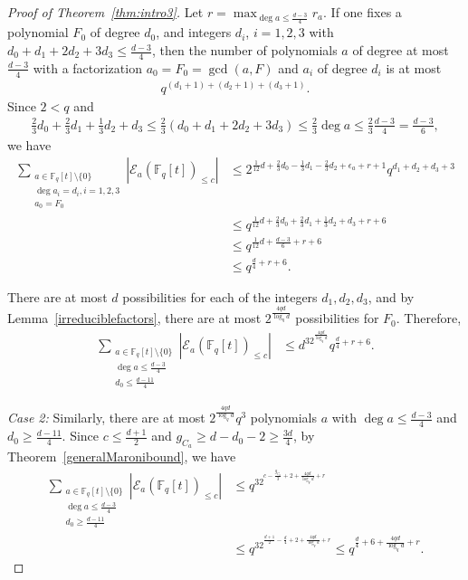 \documentclass[11pt]{article}
\theoremstyle{plain}
\theoremstyle{definition}
\begin{document}
\begin{proof}[Proof of Theorem~\ref{thm:intro3}]
Let $r=\max_{\deg a\leq \frac{d-3}{4}}r_a$. If one fixes a polynomial $F_0$ of degree $d_0$, and integers $d_i$, $i=1,2,3$ with $d_0+d_1+2d_2+3d_3\leq \frac{d-3}{4}$, then the number of polynomials $a$ of degree at most $\frac{d-3}{4}$ with a factorization $a_0=F_0=\gcd(a,F)$ and $a_i$ of degree $d_i$ is at most
\begin{align*}
q^{(d_1+1)+(d_2+1)+(d_3+1)}.
\end{align*}
Since $2<q$ and 
\begin{align*}
\frac{2}{3}d_0+\frac{2}{3}d_1+\frac{1}{3}d_2+d_3\leq \frac{2}{3}(d_0+d_1+2d_2+3d_3)\leq \frac{2}{3}\deg a\leq \frac{2}{3}\frac{d-3}{4}=\frac{d-3}{6},
\end{align*}
we have
\begin{align*}
\sum_{\substack{a\in\mathbb{F}_q[t]\setminus\{0\}\\ \deg a_i=d_i, i=1,2,3\\a_0=F_0}}    \left|\mathcal{E}_a(\mathbb{F}_q[t])_{\leq c}\right|&\leq 2^{\frac{1}{12}d+\frac{2}{3}d_0-\frac{1}{3}d_1-\frac{2}{3}d_2+\epsilon_a+r+1}q^{d_1+d_2+d_3+3}\\
&\leq q^{\frac{1}{12}d+\frac{2}{3}d_0+\frac{2}{3}d_1+\frac{1}{3}d_2+d_3+r+6}\\
&\leq q^{\frac{1}{12}d+\frac{d-3}{6}+r+6}\\
&\leq q^{\frac{d}{4}+r+6}.
\end{align*}

There are at most $d$ possibilities for each of the integers $d_1,d_2,d_3$, and by Lemma~\ref{irreduciblefactors}, there are at most $2^{\frac{4qd}{\log_qd}}$ possibilities for $F_0$. Therefore,
\begin{align*}
\sum_{\substack{a\in\mathbb{F}_q[t]\setminus\{0\}\\  \deg a\leq \frac{d-3}{4}\\ d_0\leq \frac{d-11}{4}}}    \left|\mathcal{E}_a(\mathbb{F}_q[t])_{\leq c}\right|&\leq d^32^{\frac{4qd}{\log_qd}}q^{\frac{d}{4}+r+6}.
\end{align*}
  
\emph{Case 2:} Similarly, there are at most $2^{\frac{4qd}{\log_qd}}q^3$ polynomials $a$ with $\deg a\leq \frac{d-3}{4}$ and $d_0\geq \frac{d-11}{4}$. Since $c\leq \frac{d+1}{2}$ and $g_{C_a}\geq d-d_0-2\geq \frac{3d}{4}$, by Theorem~\ref{generalMaronibound}, we have
\begin{align*}
\sum_{\substack{a\in\mathbb{F}_q[t]\setminus\{0\}\\  \deg a\leq \frac{d-3}{4}\\ d_0\geq \frac{d-11}{4}}}    \left|\mathcal{E}_a(\mathbb{F}_q[t])_{\leq c}\right|&\leq q^32^{c-\frac{g_{C_a}}{3}+2+\frac{4qd}{\log_qd}+r}\\
&\leq q^32^{\frac{d+1}{2}-\frac{d}{4}+2+\frac{4qd}{\log_qd}+r}\leq q^{\frac{d}{4}+6+\frac{4qd}{\log_qd}+r}.
\end{align*}


\end{proof}
\end{document}
